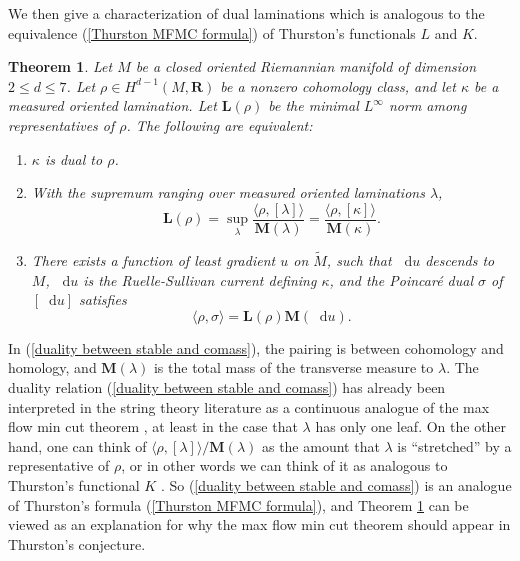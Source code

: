 \documentclass[reqno,11pt]{amsart}
\newcommand{\RR}{\mathbf{R}}
\newcommand*\dif{\mathop{}\!\mathrm{d}}
\newcommand{\Mass}{\mathbf M}
\newcommand{\Comass}{\mathbf L}
\newtheorem{theorem}{Theorem}[section]
\theoremstyle{definition}
\numberwithin{equation}{section}
\begin{document}
We then give a characterization of dual laminations which is analogous to the equivalence (\ref{Thurston MFMC formula}) of Thurston's functionals $L$ and $K$.

\begin{theorem}\label{lams are calibrated}
Let $M$ be a closed oriented Riemannian manifold of dimension $2 \leq d \leq 7$.
Let $\rho \in H^{d - 1}(M, \RR)$ be a nonzero cohomology class, and let $\kappa$ be a measured oriented lamination.
Let $\Comass(\rho)$ be the minimal $L^\infty$ norm among representatives of $\rho$.
The following are equivalent:
\begin{enumerate}
\item $\kappa$ is dual to $\rho$.
\item With the supremum ranging over measured oriented laminations $\lambda$,
\begin{equation}\label{duality between stable and comass}
\Comass(\rho) = \sup_\lambda \frac{\langle \rho, [\lambda]\rangle}{\Mass(\lambda)} = \frac{\langle \rho, [\kappa]\rangle}{\Mass(\kappa)}.
\end{equation}
\item There exists a function of least gradient $u$ on $\tilde M$, such that $\dif u$ descends to $M$, $\dif u$ is the Ruelle-Sullivan current defining $\kappa$, and the Poincar\'e dual $\sigma$ of $[\dif u]$ satisfies
$$\langle \rho, \sigma\rangle = \Comass(\rho) \Mass(\dif u).$$
\end{enumerate}
\end{theorem}

In (\ref{duality between stable and comass}), the pairing is between cohomology and homology, and $\Mass(\lambda)$ is the total mass of the transverse measure to $\lambda$.
The duality relation (\ref{duality between stable and comass}) has already been interpreted in the string theory literature as a continuous analogue of the max flow min cut theorem \cite{Freedman_2016}, at least in the case that $\lambda$ has only one leaf.
On the other hand, one can think of $\langle \rho, [\lambda]\rangle/\Mass(\lambda)$ as the amount that $\lambda$ is ``stretched'' by a representative of $\rho$, or in other words we can think of it as analogous to Thurston's functional $K$ \cite[\S5.3]{daskalopoulos2020transverse}.
So (\ref{duality between stable and comass}) is an analogue of Thurston's formula (\ref{Thurston MFMC formula}), and Theorem \ref{lams are calibrated} can be viewed as an explanation for why the max flow min cut theorem should appear in Thurston's conjecture.
\end{document}

